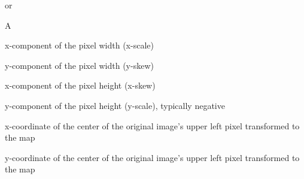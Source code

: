 or

\begin{labeling}[:]{A}
    \item[A]x-component of the pixel width (x-scale)
    \item[D]y-component of the pixel width (y-skew)
    \item[B]x-component of the pixel height (x-skew)
    \item[E]y-component of the pixel height (y-scale), typically negative
    \item[C]x-coordinate of the center of the original image's upper left pixel transformed to the map
    \item[F]y-coordinate of the center of the original image's upper left pixel transformed to the map
\end{labeling}

